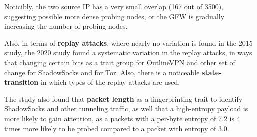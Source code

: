 \documentclass[nonacm,sigplan,screen]{acmart}
\begin{document}

Noticibly, the two source IP has a very small overlap (167 out of 3500),
suggesting possible more dense probing nodes, or the GFW is gradually
increasing the number of probing nodes.

Also, in terms of \textbf{replay attacks}, where nearly no variation is
found in the 2015 study, the 2020 study found a systematic variation in
the replay attacks, in ways that changing certain bits as a trait group
for OutlineVPN and other set of change for ShadowSocks and for Tor.
Also, there is a noticeable \textbf{state- transition} in which types of
the replay attacks are used.

The study also found that \textbf{packet length} as a fingerprinting
trait to identify ShadowSocks and other tunneling traffic, as well that
a high-entropy payload is more likely to gain attention, as a packets
with a per-byte entropy of 7.2 is 4 times more likely to be probed
compared to a packet with entropy of 3.0.
\end{document}
